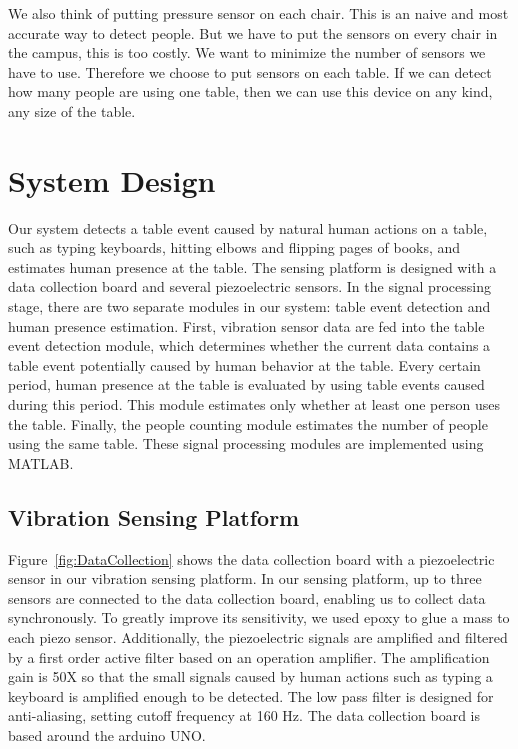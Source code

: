 \documentclass{sig-alternate-ipsn13}
\begin{document}
We also think of putting pressure sensor on each chair. This is an naive and most accurate way to detect people. But we have to put the sensors on every chair in the campus, this is too costly. We want to minimize the number of sensors we have to use. Therefore we choose to put sensors on each table. If we can detect how many people are using one table, then we can use this device on any kind, any size of the table.

\section{System Design}
Our system detects a table event caused by natural human actions on a table, such as typing keyboards, hitting elbows and flipping pages of books, and estimates human presence at the table. The sensing platform is designed with a data collection board and several piezoelectric sensors. In the signal processing stage, there are two separate modules in our system: table event detection and human presence estimation. First, vibration sensor data are fed into the table event detection module, which determines whether the current data contains a table event potentially caused by human behavior at the table. Every certain period, human presence at the table is evaluated by using table events caused during this period. This module estimates only whether at least one person uses the table. Finally, the people counting module estimates the number of people using the same table. These signal processing modules are implemented using MATLAB.

\subsection{Vibration Sensing Platform}
Figure~\ref{fig:DataCollection} shows the data collection board with a piezoelectric sensor in our vibration sensing platform. In our sensing platform, up to three sensors are connected to the data collection board, enabling us to collect data synchronously. To greatly improve its sensitivity, we used epoxy to glue a mass to each piezo sensor. Additionally, the piezoelectric signals are amplified and filtered by a first order active filter based on an operation amplifier. The amplification gain is 50X so that the small signals caused by human actions such as typing a keyboard is amplified enough to be detected. The low pass filter is designed for anti-aliasing, setting cutoff frequency at 160 Hz. The data collection board is based around the arduino UNO.
\end{document}
